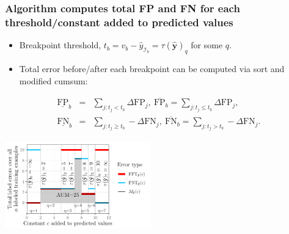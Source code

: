 \documentclass{beamer}
\begin{document}
\begin{frame}
  \frametitle{Algorithm computes total FP and FN for each threshold/constant added to predicted values}
  \begin{itemize}
  \item Breakpoint threshold,
    $t_b= v_b - \hat y_{\mathcal I_b}=\tau(\mathbf{\hat y})_q$ for
    some $q$.
  \item Total error before/after each breakpoint can be computed via
    sort and modified cumsum:
  \end{itemize}
\begin{eqnarray*}
  \underline{\text{FP}}_b &=& \sum_{j: t_j < t_b} \Delta\text{FP}_j,\ 
  \overline{\text{FP}}_b = \sum_{j: t_j \leq t_b} \Delta\text{FP}_j, \\
  \underline{\text{FN}}_b &=& \sum_{j: t_j \geq t_b} - \Delta\text{FN}_j,\ 
  \overline{\text{FN}}_b = \sum_{j: t_j > t_b} - \Delta\text{FN}_j.
\end{eqnarray*}

  \includegraphics[height=1.5in]{figure-more-than-one-more-aum}

\end{frame}
\end{document}
